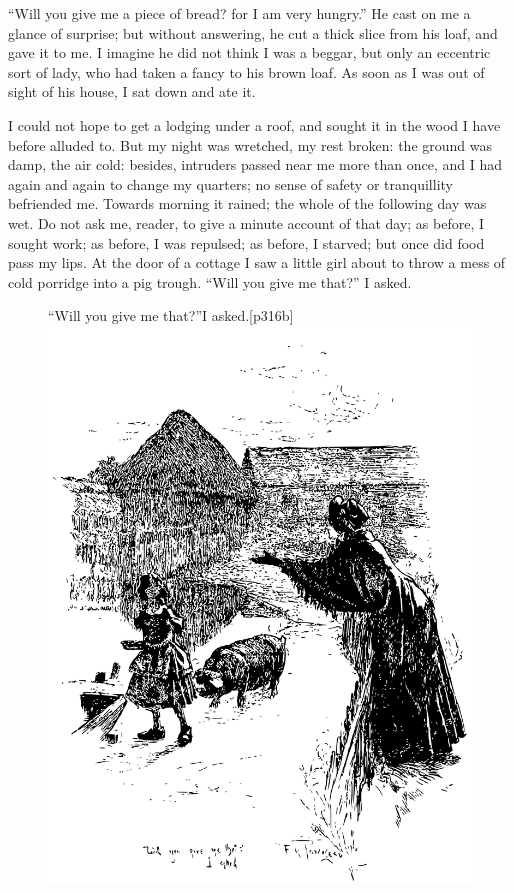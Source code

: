 \enquote{Will you give me a piece of bread? for I am very hungry.} He
cast on me a glance of surprise; but without answering, he cut a thick
slice from his loaf, and gave it to me. I imagine he did not think I
was a beggar, but only an eccentric sort of lady, who had taken a fancy
to his brown loaf. As soon as I was out of sight of his house, I sat
down and ate it.

I could not hope to get a lodging under a roof, and sought it in the
wood I have before alluded to. But my night was wretched, my rest
broken: the ground was damp, the air cold: besides, intruders passed
near me more than once, and I had again and again to change my quarters;
no sense of safety or tranquillity befriended me. Towards morning it
rained; the whole of the following day was wet. Do not ask me, reader,
to give a minute account of that day; as before, I sought work; as
before, I was repulsed; as before, I starved; but once did food pass my
lips. At the door of a cottage I saw a little girl about to throw a
mess of cold porridge into a pig trough. \enquote{Will you give me
	that?} I asked.

\begin{figure}
	\begin{sidecaption}{\enquote{Will you give me that?}\linebreak I asked.}[p316b]
		\centering
		\includegraphics[width=\linewidth]{images/p316b.pdf}
	\end{sidecaption}
\end{figure}

